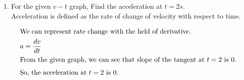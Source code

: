 \begin{enumerate}
    \item For the given $v-t$ graph, Find the acceleration at $t=2s$. \\
    Acceleration is defined as the rate of change of velocity with respect to time.
        \begin{center}
        \end{center}
        \begin{solution}
            \begin{align*}
                \intertext{We can represent rate change with the held of derivative.}
                a &= \dfrac{dv}{dt}\\
                \intertext{From the given graph, we can see that slope of the tangent at $t=2$ is $0$.}
                \intertext{So, the acceleration at $t=2$ is $0$.}
            \end{align*}
        \end{solution}
    

\end{enumerate}
